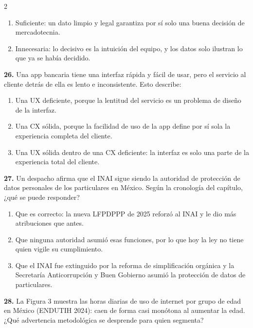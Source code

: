\documentclass[10pt,letterpaper]{article}
\begin{document}
\begin{multicols}{2}
\begin{enumerate}[label=\alph*),leftmargin=1.1em,itemsep=0pt,topsep=1pt,parsep=0pt,partopsep=0pt]
\item Suficiente: un dato limpio y legal garantiza por sí solo una buena decisión de mercadotecnia.
\item Innecesaria: lo decisivo es la intuición del equipo, y los datos solo ilustran lo que ya se había decidido.
\end{enumerate}
\vspace{2pt}
\noindent\textbf{26.} Una app bancaria tiene una interfaz rápida y fácil de usar, pero el servicio al cliente detrás de ella es lento e inconsistente. Esto describe:
\vspace{-3pt}
\begin{enumerate}[label=\alph*),leftmargin=1.1em,itemsep=0pt,topsep=1pt,parsep=0pt,partopsep=0pt]
\item Una UX deficiente, porque la lentitud del servicio es un problema de diseño de la interfaz.
\item Una CX sólida, porque la facilidad de uso de la app define por sí sola la experiencia completa del cliente.
\item Una UX sólida dentro de una CX deficiente: la interfaz es solo una parte de la experiencia total del cliente.
\end{enumerate}
\vspace{2pt}
\noindent\textbf{27.} Un despacho afirma que el INAI sigue siendo la autoridad de protección de datos personales de los particulares en México. Según la cronología del capítulo, ¿qué se puede responder?
\vspace{-3pt}
\begin{enumerate}[label=\alph*),leftmargin=1.1em,itemsep=0pt,topsep=1pt,parsep=0pt,partopsep=0pt]
\item Que es correcto: la nueva LFPDPPP de 2025 reforzó al INAI y le dio más atribuciones que antes.
\item Que ninguna autoridad asumió esas funciones, por lo que hoy la ley no tiene quien vigile su cumplimiento.
\item Que el INAI fue extinguido por la reforma de simplificación orgánica y la Secretaría Anticorrupción y Buen Gobierno asumió la protección de datos de particulares.
\end{enumerate}
\vspace{2pt}
\noindent\textbf{28.} La Figura 3 muestra las horas diarias de uso de internet por grupo de edad en México (ENDUTIH 2024): caen de forma casi monótona al aumentar la edad. ¿Qué advertencia metodológica se desprende para quien segmenta?
\vspace{-3pt}

\end{multicols}
\end{document}
